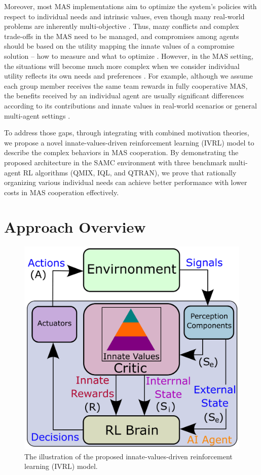 \documentclass[letterpaper]{article} %
\begin{document}
Moreover, most MAS implementations aim to optimize the system's policies with respect to individual needs and intrinsic values, even though many real-world problems are inherently multi-objective \cite{ruadulescu2020multi}. Thus, many conflicts and complex trade-offs in the MAS need to be managed, and compromises among agents should be based on the utility mapping the innate values of a compromise solution -- how to measure and what to optimize \cite{zintgraf2015quality}. However, in the MAS setting, the situations will become much more complex when we consider individual utility reflects its own needs and preferences \cite{yang2019self,yang2020hierarchical}. For example, although we assume each group member receives the same team rewards in fully cooperative MAS, the benefits received by an individual agent are usually significant differences according to its contributions and innate values in real-world scenarios or general multi-agent settings \cite{yang2023understanding}.

To address those gaps, through integrating with combined motivation theories, we propose a novel innate-values-driven reinforcement learning (IVRL) model to describe the complex behaviors in MAS cooperation. By demonstrating the proposed architecture in the SAMC environment with three benchmark multi-agent RL algorithms (QMIX, IQL, and QTRAN), we prove that rationally organizing various individual needs can achieve better performance with lower costs in MAS cooperation effectively.

\section{Approach Overview}

\begin{figure}[t]
\centering
\includegraphics[width=0.85\columnwidth]{./figures/innate_values_RL_models.pdf}
\caption{The illustration of the proposed innate-values-driven reinforcement learning (IVRL) model.}
\label{fig:innate_values}
\end{figure}
\end{document}
